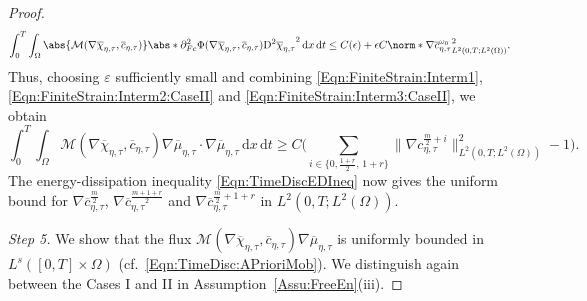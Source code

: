 \documentclass[a4paper,12pt]{article}
\newcommand{\calM}{\mathcal{M}}
\newcommand{\eps}{\varepsilon}
\newcommand{\pl}{\partial}
\newcommand{\dx}{\mathrm{\,d}x}
\newcommand{\dt}{\mathrm{\,d}t}
\newcommand{\chibar}{\overline{\chi}}
\newcommand{\mubar}{\overline{\mu}}
\newcommand{\cbar}{\overline{c}}
\newcommand{\rmD}{\mathrm{D}}
\theoremstyle{plain}
\theoremstyle{definition}
\numberwithin{equation}{section}
\begin{document}
\begin{proof}
\begin{equation}
    \label{Eqn:FiniteStrain:Interm3:CaseII}
    	\int_0^T\int_\Omega \abs{\calM(\nabla\chibar_{\eta,\tau},\cbar_{\eta,\tau})}\abs*{\pl^2_{Fc}\Phi(\nabla\chibar_{\eta,\tau},\cbar_{\eta,\tau})\rmD^2\chibar_{\eta,\tau}}^2\dx\dt \leq C(\epsilon) + \epsilon C\norm*{\nabla \cbar_{\eta,\tau}^{\omega_0}}^2_{L^2(0,T;L^2(\Omega))}.
    \end{equation}
Thus, choosing $\eps$ sufficiently small and combining \eqref{Eqn:FiniteStrain:Interm1}, \eqref{Eqn:FiniteStrain:Interm2:CaseII} and \eqref{Eqn:FiniteStrain:Interm3:CaseII}, we obtain
\begin{equation*}
	\int_0^T\int_\Omega \calM(\nabla\chibar_{\eta,\tau},\cbar_{\eta,\tau})\nabla\mubar_{\eta,\tau}\cdot\nabla\mubar_{\eta,\tau} \dx\dt \geq C\Big(\sum_{i\in \{0,\frac{1+r}{2},\, 1+r\}} \big\|{\nabla c^{\frac{m}{2}+i}_{\eta,\tau}}\big\|^2_{L^2(0,T;L^2(\Omega))} - 1\Big).
    \end{equation*} 
The energy-dissipation inequality \eqref{Eqn:TimeDiscEDIneq} now gives the uniform bound for $\nabla \cbar_{\eta,\tau}^\frac{m}{2}$, $\nabla \cbar_{\eta,\tau}^\frac{m+1+r}{2}$ and $\nabla \cbar_{\eta,\tau}^{\frac{m}{2}+1+r}$ in $L^2(0,T;L^2(\Omega))$. \medskip




%
%
%
%
%
%
%
%
%
%
%
%
%
    


 \emph{Step 5.} 
 We show that the flux $\calM(\nabla\chibar_{\eta,\tau},\cbar_{\eta,\tau})\nabla\mubar_{\eta,\tau}$ is uniformly
 bounded in $L^s([0,T]\times\Omega)$ (cf.~\eqref{Eqn:TimeDisc:APrioriMob}). 
We distinguish again between the Cases I and II in Assumption~\ref{Assu:FreeEn}(iii).
 

\end{proof}
\end{document}
